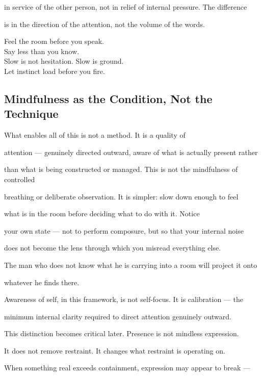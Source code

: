 in service of the other person, not in relief of internal pressure. The difference

is in the direction of the attention, not the volume of the words.

\begin{calloutbox}

Feel the room before you speak.\\

Say less than you know.\\

Slow is not hesitation. Slow is ground.\\

Let instinct load before you fire.

\end{calloutbox}

\subsection{Mindfulness as the Condition, Not the Technique}

What enables all of this is not a method. It is a quality of

attention --- genuinely directed outward, aware of what is actually present rather

than what is being constructed or managed. This is not the mindfulness of controlled

breathing or deliberate observation. It is simpler: slow down enough to feel

what is in the room before deciding what to do with it. Notice

your own state --- not to perform composure, but so that your internal noise

does not become the lens through which you misread everything else.

The man who does not know what he is carrying into a room will project it onto

whatever he finds there.

Awareness of self, in this framework, is not self-focus. It is calibration --- the

minimum internal clarity required to direct attention genuinely outward.

This distinction becomes critical later. Presence is not mindless expression.

It does not remove restraint. It changes what restraint is operating on.

When something real exceeds containment, expression may appear to break ---


